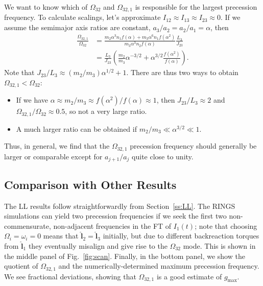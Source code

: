 \documentclass[11pt,
        usenames, %
        dvipsnames %
    ]{article}
\newcommand*{\bm}[1]{\boldsymbol{\mathbf{#1}}}
\newcommand*{\uv}[1]{\hat{\bm{#1}}}
\newcommand*{\p}[1]{\left(#1\right)}
\begin{document}
We want to know which of $\Omega_{32}$ and $\Omega_{32, 1}$ is responsible for
the largest precession frequency. To calculate scalings, let's approximate
$I_{12} \approx I_{13} \approx I_{23} \approx 0$. If we assume the semimajor
axis ratios are constant, $a_3 / a_2 = a_2 / a_1 = \alpha$, then
\begin{align}
    \frac{\Omega_{32, 1}}{\Omega_{32}}
        &= \frac{m_2 \alpha^3 n_1 f(\alpha)
            + m_3 \alpha^6 n_1 f(\alpha^2)}{m_3 \alpha^3 n_2
            f(\alpha)}\frac{L_3}{J_{23}}\nonumber\\
        &= \frac{L_3}{J_{23}}\p{
            \frac{m_2}{m_3}\alpha^{-3/2}
                + \alpha^{3/2}\frac{f\p{\alpha^2}}{f(\alpha)}}.
\end{align}
Note that $J_{23} / L_3 \approx (m_2/m_3)\alpha^{1/2} + 1$. There are thus two
ways to obtain $\Omega_{32, 1} < \Omega_{32}$:
\begin{itemize}
    \item If we have $\alpha \approx m_2/m_3 \approx f\p{\alpha^2} / f(\alpha)
        \approx 1$, then $J_{23} / L_3 \approx 2$ and $\Omega_{32, 1} /
        \Omega_{32} \approx 0.5$, so not a very large ratio.

    \item A much larger ratio can be obtained if $m_2/m_3 \ll \alpha^{3/2} \ll
        1$.
\end{itemize}
Thus, in general, we find that the $\Omega_{32, 1}$ precession frequency should
generally be larger or comparable except for $a_{j + 1} / a_j$ quite close to
unity.

\subsection{Comparison with Other Results}

The LL results follow straightforwardly from Section~\ref{ss:LL}. The RINGS
simulations can yield two precession frequencies if we seek the first two
non-commensurate, non-adjacent frequencies in the FT of $I_1(t)$; note that
choosing $\Omega_{i} = \omega_i = 0$ means that $\uv{l}_2 = \uv{l}_3$ initially,
but due to different backreaction torques from $\uv{l}_1$ they eventually
misalign and give rise to the $\Omega_{32}$ mode. This is shown in the middle
panel of Fig.~\ref{fig:scan}. Finally, in the bottom panel, we show the quotient
of $\Omega_{32, 1}$ and the numerically-determined maximum precession frequency.
We see fractional deviations, showing that $\Omega_{32, 1}$ is a good estimate
of $g_{\max}$.
\end{document}
